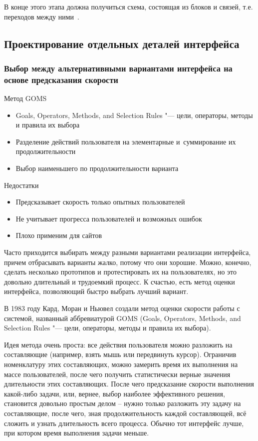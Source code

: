 \documentclass{../industrial-development}
\begin{document}
В конце этого этапа должна получиться схема, состоящая из блоков и связей, т.е. переходов между ними~\cite[с.~118--119]{Golovach}.

\subsection{Проектирование отдельных деталей интерфейса}

\begin{frame} \frametitle{Выбор между альтернативными вариантами интерфейса на основе предсказания скорости}
 \begin{block}{Метод GOMS}
  \begin{itemize}
   \item Goals, Operators, Methods, and Selection Rules "--- цели, операторы, методы и правила их выбора
   \item Разделение действий пользователя на элементарные и~суммирование их продолжительности
   \item Выбор наименьшего по продолжительности варианта
  \end{itemize}
 \end{block}
 \begin{block}{Недостатки}
  \begin{itemize}
   \item Предсказывает скорость только опытных пользователей
   \item Не учитывает прогресса пользователей и возможных ошибок
   \item Плохо применим для сайтов
  \end{itemize}
 \end{block}
\end{frame}

\lecturenotes

Часто приходится выбирать между разными вариантами реализации интерфейса, причем отбрасывать варианты жалко, потому что они хорошие. Можно, конечно, сделать несколько прототипов и протестировать их на пользователях, но это довольно длительный и трудоемкий процесс. К счастью, есть метод оценки интерфейса, позволяющий быстро выбрать лучший вариант.

В 1983 году Кард, Моран и Ньювел создали метод оценки скорости работы с системой, названный аббревиатурой GOMS (Goals, Operators, Methods, and Selection Rules "--- цели, операторы, методы и правила их выбора).

Идея метода очень проста: все действия пользователя можно разложить на составляющие (например, взять мышь или передвинуть курсор). Ограничив номенклатуру этих составляющих, можно замерить время их выполнения на массе пользователей, после чего получить статистически верные значения длительности этих составляющих. После чего предсказание скорости выполнения какой-либо задачи, или, вернее, выбор наиболее эффективного решения, становится довольно простым делом – нужно только разложить эту задачу на составляющие, после чего, зная продолжительность каждой составляющей, всё сложить и узнать длительность всего процесса. Обычно тот интерфейс лучше, при котором время выполнения задачи меньше.
\end{document}
